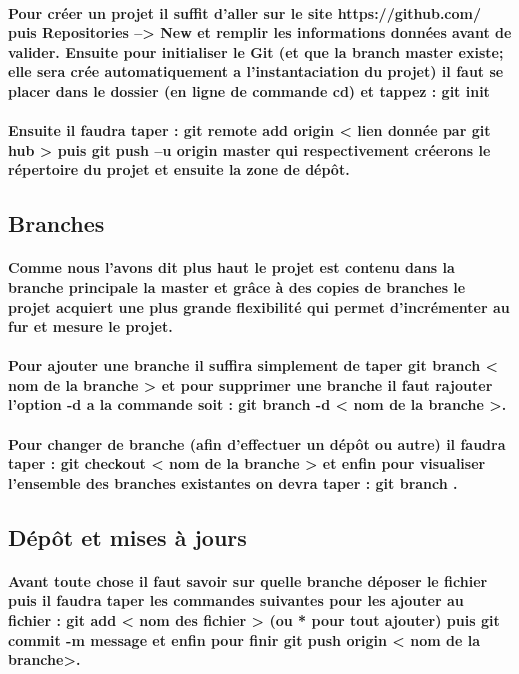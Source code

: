 \documentclass[a4paper, 12pt, twoside]{article}
\begin{document}
\paragraph{ Pour créer un projet il suffit d'aller sur le site  https://github.com/ puis Repositories --> New et remplir les informations données avant
de valider. Ensuite pour initialiser le Git (et que la branch master existe; elle sera crée automatiquement a l'instantaciation du projet) il faut se placer dans le dossier (en ligne de commande cd) et tappez :  git init}

\paragraph{Ensuite  il faudra taper :  git remote add origin < lien donnée par git hub >  puis  git push –u origin master  qui respectivement créerons le répertoire du projet et ensuite la zone de dépôt.}

\subsection{Branches}
\paragraph{Comme nous l'avons dit plus haut le projet est contenu dans la branche principale la master et grâce à des copies de branches le projet 
acquiert une plus grande flexibilité qui permet d'incrémenter au fur et mesure le projet.}
\paragraph{Pour ajouter une branche il suffira simplement de taper  git branch < nom de la branche >  et pour supprimer une branche il faut rajouter
l'option -d a la commande soit :  git branch -d < nom de la branche >.}
\paragraph{  Pour changer de branche (afin d'effectuer un dépôt ou autre) il faudra taper :  git checkout < nom de la branche >   et enfin pour visualiser
l'ensemble des branches existantes on devra taper :  git branch .}
\subsection{Dépôt et mises à jours}
\paragraph{ Avant toute chose il faut savoir sur quelle branche déposer le fichier puis il faudra taper les commandes suivantes pour les ajouter 
au fichier :  git add < nom des fichier >  (ou * pour tout ajouter) puis  git commit -m message  et enfin pour finir git push origin < nom de la branche>.}
\end{document}
